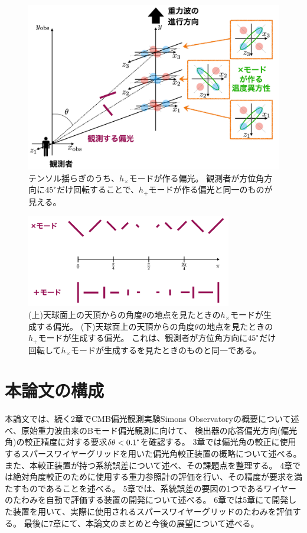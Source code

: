 \documentclass[../../main.tex]{subfiles}
\begin{document}
\begin{figure}[H]
    \centering
    \includegraphics[width=1.0\textwidth]{intro/tensor_polarization.pdf}
    \caption{テンソル揺らぎのうち、$h_{\times}$モードが作る偏光。
    観測者が方位角方向に$45\tcdegree$だけ回転することで、$h_{+}$モードが作る偏光と同一のものが見える。}
    \label{fig:tensor_polarization}
\end{figure}
\begin{figure}[H]
    \centering
    \includegraphics[width=0.8\textwidth]{intro/tensor_pol_theta.pdf}
    \caption{(上)天球面上の天頂からの角度$\theta$の地点を見たときの$h_{\times}$モードが生成する偏光。
    (下)天球面上の天頂からの角度$\theta$の地点を見たときの$h_{+}$モードが生成する偏光。
    これは、観測者が方位角方向に$45\tcdegree$だけ回転して$h_{\times}$モードが生成するを見たときのものと同一である。}
    \label{fig:tensor_polarization_theta}
\end{figure}

\section{本論文の構成}
本論文では、続く2章でCMB偏光観測実験Simons Observatoryの概要について述べ、原始重力波由来のBモード偏光観測に向けて、
検出器の応答偏光方向(偏光角)の較正精度に対する要求$\delta\theta < 0.1\tcdegree$を確認する。
3章では偏光角の較正に使用するスパースワイヤーグリッドを用いた偏光角較正装置の概略について述べる。
また、本較正装置が持つ系統誤差について述べ、その課題点を整理する。
4章では絶対角度較正のために使用する重力参照計の評価を行い、その精度が要求を満たすものであることを述べる。
5章では、系統誤差の要因の1つであるワイヤーのたわみを自動で評価する装置の開発について述べる。
6章では5章にて開発した装置を用いて、実際に使用されるスパースワイヤーグリッドのたわみを評価する。
最後に7章にて、本論文のまとめと今後の展望について述べる。
\end{document}
